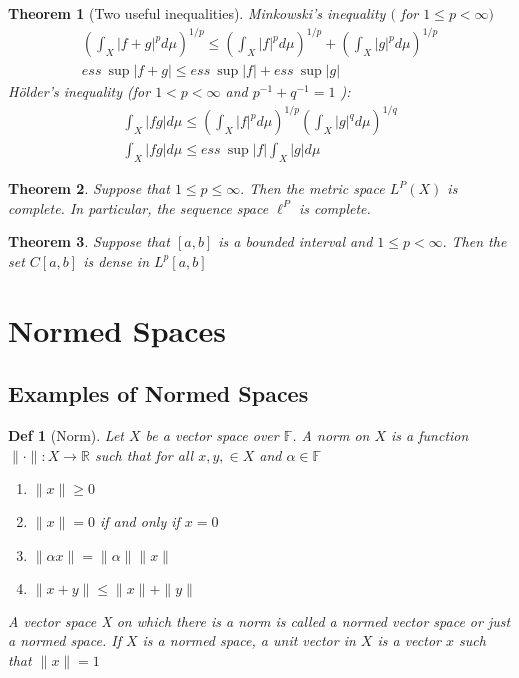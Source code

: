 \documentclass[10pt]{paper}
\newtheorem{theorem}{Theorem}[section]
\newtheorem{definition}{Def}[section]
\begin{document}
\begin{theorem}[Two useful inequalities]
    Minkowski's inequality $($ for $1 \leq p<\infty)$
    $$
        \begin{array}{c}
            \left(\int_{X}|f+g|^{p} d \mu\right)^{1 / p} \leq\left(\int_{X}|f|^{p} d \mu\right)^{1 / p}+\left(\int_{X}|g|^{p} d \mu\right)^{1 / p} \\
            ess\  \sup |f+g| \leq ess\  \sup |f|+ess\  \sup |g|
        \end{array}
    $$
    Hölder's inequality (for $1<p<\infty$ and $p^{-1}+q^{-1}=1$ ):
    $$
        \begin{array}{l}
            \int_{X}|f g| d \mu \leq\left(\int_{X}|f|^{p} d \mu\right)^{1 / p}\left(\int_{X}|g|^{q} d \mu\right)^{1 / q} \\
            \int_{X}|f g| d \mu \leq ess\  \sup |f| \int_{X}|g| d \mu
        \end{array}
    $$
\end{theorem}


\begin{theorem}
    Suppose that $1 \leq p \leq \infty .$ Then the metric space $L^{P}(X)$ is complete. In particular, the sequence space $\ell^{P}$ is complete.
\end{theorem}

\begin{theorem}
    Suppose that $[a, b]$ is a bounded interval and $1 \leq p<\infty .$ Then the set $C[a, b]$ is dense in $L^{p}[a, b]$
\end{theorem}



\section{Normed Spaces}
\subsection{Examples of Normed Spaces}
\begin{definition}[Norm]
    Let $X$ be a vector space over $\mathbb{F}$. A norm on $X$ is a function $\|\cdot\|: X \rightarrow \mathbb{R}$ such that for all $x, y, \in X$ and $\alpha \in \mathbb{F}$
    \begin{enumerate}
        \item $\|x\| \geq 0$
        \item $\|x\|=0$ if and only if $x=0$
        \item $\|\alpha x\|=\|\alpha\|\|x\|$
        \item $\|x+y\| \leq\|x\|+\|y\|$
    \end{enumerate}
    A vector space X on which there is a norm is called a normed vector space or just a normed space. If $X$ is a normed space, a unit vector in $X$ is a vector $x$ such that $\|x\|=1$
\end{definition}
\end{document}
